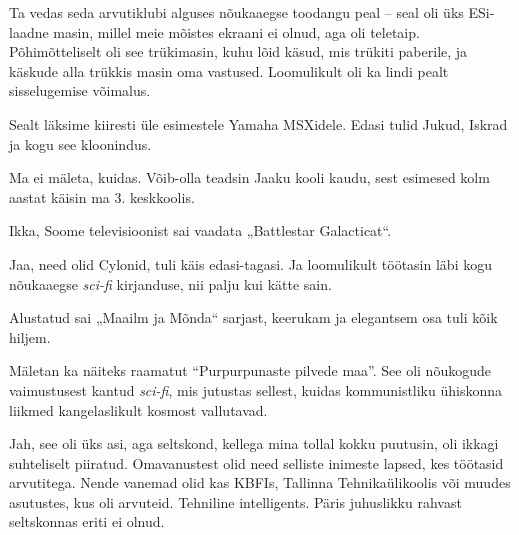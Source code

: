Ta vedas seda arvutiklubi alguses nõukaaegse toodangu peal – seal oli üks
ESi-laadne masin, millel meie mõistes ekraani ei olnud, aga oli teletaip. 
Põhimõtteliselt oli see trükimasin, kuhu lõid käsud, mis trükiti 
paberile, ja käskude alla trükkis masin oma vastused. Loomulikult oli ka lindi pealt sisselugemise võimalus.

Sealt läksime kiiresti üle esimestele Yamaha 
MSXidele. Edasi tulid Jukud, 
Iskrad ja kogu see kloonindus.


Ma ei mäleta, kuidas. Võib-olla teadsin Jaaku kooli kaudu, sest esimesed kolm aastat käisin ma 3. keskkoolis.


Ikka, Soome televisioonist sai vaadata „Battlestar Galacticat“.


Jaa, need olid Cylonid, tuli käis edasi-tagasi. Ja loomulikult töötasin läbi kogu nõukaaegse 
\emph{sci-fi} kirjanduse, nii palju kui kätte sain.


Alustatud sai „Maailm ja Mõnda“ sarjast, keerukam ja elegantsem osa tuli kõik hiljem. 

Mäletan ka näiteks raamatut \enquote{Purpurpunaste pilvede 
maa}. See oli nõukogude vaimustusest 
kantud \emph{sci-fi}, mis jutustas sellest, kuidas kommunistliku ühiskonna liikmed 
kangelaslikult kosmost vallutavad.


Jah, see oli üks asi, aga seltskond, kellega mina tollal kokku puutusin, oli 
ikkagi suhteliselt piiratud. Omavanustest olid need selliste inimeste 
lapsed, kes töötasid arvutitega. Nende vanemad olid kas 
KBFIs, Tallinna Tehnikaülikoolis või muudes asutustes, kus oli arvuteid. 
Tehniline intelligents. Päris juhuslikku rahvast seltskonnas eriti ei 
olnud.

